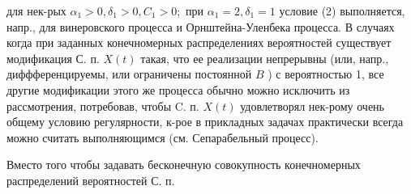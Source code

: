 \documentclass[10pt]{article}
\begin{document}
для нек-рых $\alpha_{1}>0, \delta_{1}>0, C_{1}>0 ;$ при $\alpha_{1}=2, \delta_{1}=1$ условие (2) выполняется, напр., для винеровского процесса и Орнштейна-Уленбека процесса. В случаях когда при заданных конечномерных распределениях вероятностей существует модификация С. п. $X(t)$ такая, что ее реализации непрерывны (или, напр., диффференцируемы, или ограничены постоянной $B$ ) с вероятностью 1, все другие модификации этого же процесса обычно можно исключить из рассмотрения, потребовав, чтобы C. п. $X(t)$ удовлетворял нек-рому очень общему условию регулярности, к-рое в прикладных задачах практически всегда можно считать выполняющимся (см. Сепарабельный процесс).



Вместо того чтобы задавать бесконечную совокупность конечномерных распределений вероятностей С. п.
\end{document}
